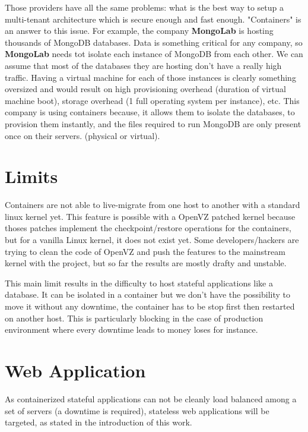 Those providers have all the same problems: what is the best way to setup a
multi-tenant architecture which is secure enough and fast enough. "Containers"
is an answer to this issue. For example, the company \textbf{MongoLab} is hosting
thousands of MongoDB databases. Data is something critical for any company, so
\textbf{MongoLab} needs tot isolate each instance of MongoDB from each other.
We can assume that most of the databases they are hosting don't have a really high
traffic. Having a virtual machine for each of those instances is clearly something
oversized and would result on high provisioning overhead (duration of virtual
machine boot), storage overhead (1 full operating system per instance), etc.
This company is using containers because, it allows them to isolate the databases,
to provision them instantly, and the files required to run MongoDB are
only present once on their servers. (physical or virtual).

\section{Limits}

Containers are not able to live-migrate from one host to another with a
standard linux kernel yet. This feature is possible with a OpenVZ patched
kernel because thoses patches implement the checkpoint/restore operations for
the containers, but for a vanilla Linux kernel, it does not exist yet. Some
developers/hackers are trying to clean the code of OpenVZ and push the features
to the mainstream kernel with the \cite{websiteCRIU} project, but so far the
results are mostly drafty and unstable.

This main limit results in the difficulty to host stateful applications like a
database. It can be isolated in a container but we don't have the possibility
to move it without any downtime, the container has to be stop first then
restarted on another host. This is particularly blocking in the case of
production environment where every downtime leads to money loses for instance.

\section{Web Application}

As containerized stateful applications can not be cleanly load balanced among a
set of servers (a downtime is required), stateless web applications will be
targeted, as stated in the introduction of this work.

